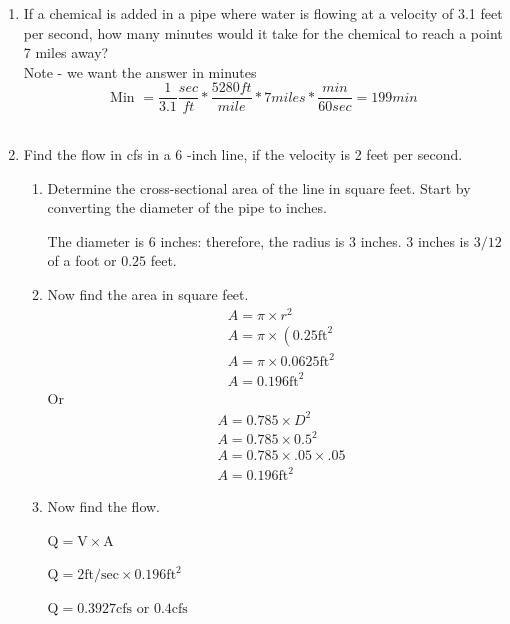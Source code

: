\documentclass{article}
\begin{document}
\begin{enumerate}
\item If a chemical is added in a pipe where water is flowing at a velocity of 3.1 feet per second, how many minutes would it take for the chemical to reach a point 7 miles away?  \\

Note - we want the answer in minutes\\

$$\textrm{Min } = \dfrac{1}{3.1}\dfrac{sec}{ft}*\dfrac{5280ft}{mile}*7 miles*\dfrac{min}{60 sec} = \boxed{199 min}$$
\\

\item Find the flow in cfs in a 6 -inch line, if the velocity is 2 feet per second.

\begin{enumerate}
\item Determine the cross-sectional area of the line in square feet. Start by converting the diameter of the pipe to inches.

The diameter is 6 inches: therefore, the radius is 3 inches. 3 inches is $3 / 12$ of a foot or $0.25$ feet.

\item Now find the area in square feet.
$$
\begin{aligned}
&A=\pi \times r^{2} \\
&A=\pi \times\left(0.25 \mathrm{ft}^{2}\right. \\
&A=\pi \times 0.0625 \mathrm{ft}^{2} \\
&A=0.196 \mathrm{ft}^{2}
\end{aligned}
$$
Or
$$
\begin{aligned}
&A=0.785 \times D^{2} \\
&A=0.785 \times 0.5^{2} \\
&A=0.785 \times .05 \times .05 \\
&A=0.196 \mathrm{ft}^{2}
\end{aligned}
$$

\item Now find the flow.

$\mathrm{Q}=\mathrm{V} \times \mathrm{A}$

$\mathrm{Q}=2 \mathrm{ft} / \mathrm{sec} \times 0.196 \mathrm{ft}^{2}$

$\mathrm{Q}=0.3927 \mathrm{cfs}$ or $0.4 \mathrm{cfs}$
\end{enumerate}


\end{enumerate}
\end{document}
